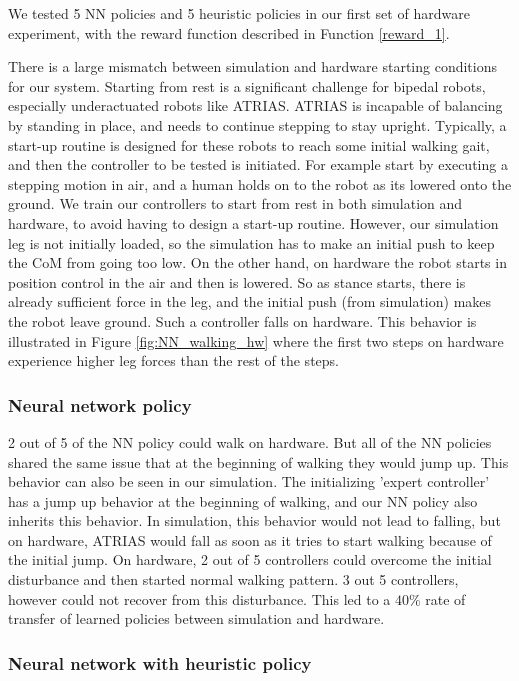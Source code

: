 We tested 5 NN policies and 5 heuristic policies in our first set of hardware experiment, with the reward function described in Function \ref{reward_1}. 

There is a large mismatch between simulation and hardware starting conditions for our system. Starting from rest is a significant challenge for bipedal robots, especially underactuated robots like ATRIAS. ATRIAS is incapable of balancing by standing in place, and needs to continue stepping to stay upright. Typically, a start-up routine is designed for these robots to reach some initial walking gait, and then the controller to be tested is initiated. For example \cite{hubicki2016atrias} start by executing a stepping motion in air, and a human holds on to the robot as its lowered onto the ground. We train our controllers to start from rest in both simulation and hardware, to avoid having to design a start-up routine. However, our simulation leg is not initially loaded, so the simulation has to make an initial push to keep the CoM from going too low. On the other hand, on hardware the robot starts in position control in the air and then is lowered. So as stance starts, there is already sufficient force in the leg, and the initial push (from simulation) makes the robot leave ground. Such a controller falls on hardware. This behavior is illustrated in Figure \ref{fig:NN_walking_hw} where the first two steps on hardware experience higher leg forces than the rest of the steps.

\subsubsection{Neural network policy}

2 out of 5 of the NN policy could walk on hardware. But all of the NN policies shared the same issue that at the beginning of walking they would jump up. This behavior can also be seen in our simulation. The initializing 'expert controller' has a jump up behavior at the beginning of walking, and our NN policy also inherits this behavior. In simulation, this behavior would not lead to falling, but on hardware, ATRIAS would fall as soon as it tries to start walking because of the initial jump. On hardware, 2 out of 5 controllers could overcome the initial disturbance and then started normal walking pattern. 3 out 5 controllers, however could not recover from this disturbance. This led to a \textbf{$40\%$} rate of transfer of learned policies between simulation and hardware.

\subsubsection{Neural network with heuristic policy}

